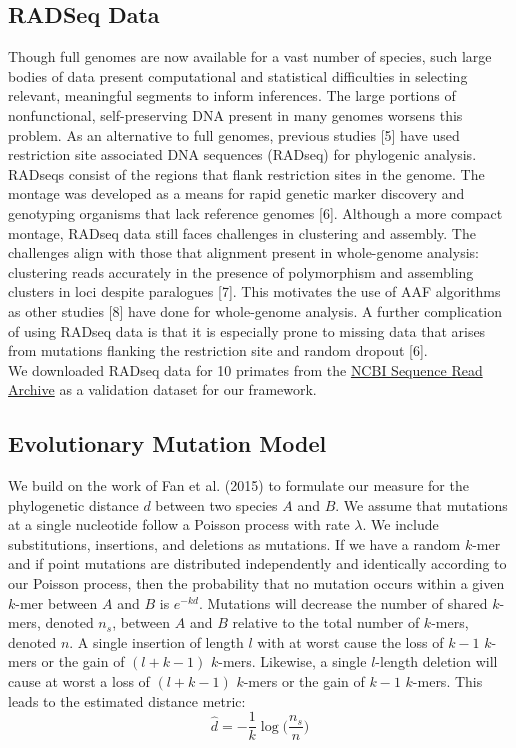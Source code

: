 \documentclass[a4paper]{article}
\begin{document}
\begin{multicols}{2}
\subsection{RADSeq Data}
Though full genomes are now available for a vast number of species, such large bodies of data present computational and statistical difficulties in selecting relevant, meaningful segments to inform inferences. The large portions of nonfunctional, self-preserving DNA present in many genomes worsens this problem. As an alternative to full genomes, previous studies [5] have used restriction site associated DNA sequences (RADseq) for phylogenic analysis. RADseqs consist of the regions that flank restriction sites in the genome. The montage was developed as a means for rapid genetic marker discovery and genotyping organisms that lack reference genomes [6]. Although a more compact montage, RADseq data still faces challenges in clustering and assembly. The challenges align with those that alignment present in whole-genome analysis: clustering reads accurately in the presence of polymorphism and assembling clusters in loci despite paralogues [7]. This motivates the use of AAF algorithms as other studies [8] have done for whole-genome analysis. A further complication of using RADseq data is that it is especially prone to missing data that arises from mutations flanking the restriction site and random dropout [6].\\

We downloaded RADseq data for 10 primates from the \href{https://www.ncbi.nlm.nih.gov/sra}{NCBI Sequence Read Archive} as a validation dataset for our framework.

\subsection{Evolutionary Mutation Model}
We build on the work of Fan et al. (2015) to formulate our measure for the phylogenetic distance $d$ between two species $A$ and $B$. We assume that mutations at a single nucleotide follow a Poisson process with rate $\lambda$. We include substitutions, insertions, and deletions as mutations. If we have a random $k$-mer and if point mutations are distributed independently and identically according to our Poisson process, then the probability that no mutation occurs within a given $k$-mer between $A$ and $B$ is $e^{-kd}$. Mutations will decrease the number of shared $k$-mers, denoted $n_s$, between $A$ and $B$ relative to the total number of $k$-mers, denoted $n$. A single insertion of length $l$ with at worst cause the loss of $k-1$ $k$-mers or the gain of $(l + k - 1)$ $k$-mers. Likewise, a single $l$-length deletion will cause at worst a loss of $(l + k - 1)$ $k$-mers or the gain of $k-1$ $k$-mers. This leads to the estimated distance metric:
$$
\hat{d} = -\frac{1}{k} \log \Big(\frac{n_s}{n}\Big)
$$


\end{multicols}
\end{document}
